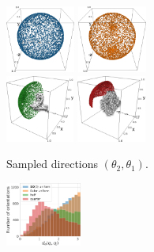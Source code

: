 \begin{figure}[ht!]
    \centering
    \begin{minipage}{.35\linewidth}
        \begin{subfigure}[b]{\linewidth}
            \centering
            \includegraphics[height=2.2cm]{figures/uniform_quaternion.png}%
            \hfill
            \includegraphics[height=2.2cm]{figures/uniform_angles.png}
            \\ \vspace{0.4cm}
            \includegraphics[height=2.2cm]{figures/5j0n-cvg2.pdf}
            \hfill
            \includegraphics[height=2.2cm]{figures/5a1a-cvg2.pdf}
            \caption{Sampled directions $(\theta_2, \theta_1)$.}%
            \label{fig:orientation-sampling:directions}
        \end{subfigure}
    \end{minipage}
    \hfill
    \begin{minipage}{.62\linewidth}
        \begin{subfigure}[b]{0.35\linewidth}
            \centering
            \includegraphics[height=2.1cm]{figures/dQ_distribution_coverage.pdf}

\end{subfigure}
\end{minipage}
\end{figure}

